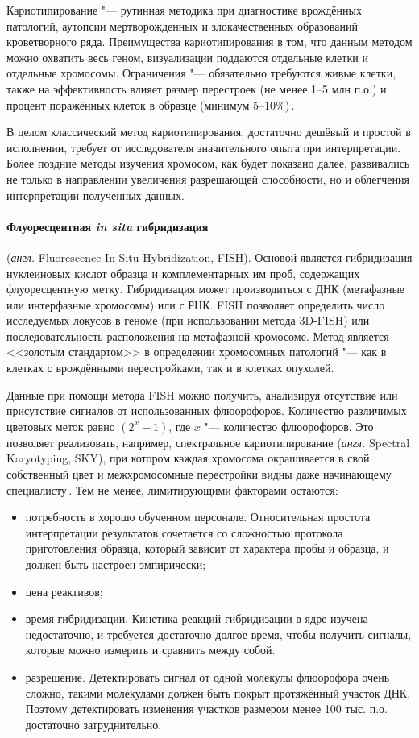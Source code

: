\documentclass[a4paper,14pt]{extarticle}
\newcommand{\anglia}[1]{\textit{англ.} \textenglish{#1}}
\begin{document}
Кариотипирование "--- рутинная методика при диагностике врождённых патологий, аутопсии мертворожденных и злокачественных образований кроветворного ряда.
Преимущества кариотипирования в том, что данным методом можно охватить весь геном, визуализации поддаются отдельные клетки и отдельные хромосомы.
Ограничения "--- обязательно требуются живые клетки, также на эффективность влияет размер перестроек (не менее 1--5 млн п.о.) и процент поражённых клеток в образце (минимум 5--10\%)\,\cite{Sampson_2014}.

В целом классический метод кариотипирования, достаточно дешёвый и простой в исполнении, требует от исследователя значительного опыта при интерпретации.
Более поздние методы изучения хромосом, как будет показано далее, развивались не только в направлении увеличения разрешающей способности, но и облегчения интерпретации полученных данных.

\paragraph{Флуоресцентная \textit{in situ} гибридизация} (\anglia{Fluorescence In Situ Hybridization, FISH}).
Основой является гибридизация нуклеиновых кислот образца и комплементарных им проб, содержащих флуоресцентную метку.
Гибридизация может производиться с ДНК (метафазные или интерфазные хромосомы) или с РНК.
FISH позволяет определить число исследуемых локусов в геноме (при использовании метода 3D-FISH) или последовательность расположения на метафазной хромосоме.
Метод является <<золотым стандартом>> в определении хромосомных патологий "--- как в клетках с врождёнными перестройками, так и в клетках опухолей.

Данные при помощи метода FISH можно получить, анализируя отсутствие или присутствие сигналов от использованных флюорофоров.
Количество различимых цветовых меток равно $(2^x - 1)$, где  $x$ "--- количество флюорофоров.
Это позволяет реализовать, например, спектральное кариотипирование (\anglia{Spectral Karyotyping, SKY}), при котором каждая хромосома окрашивается в свой собственный цвет и межхромосомные перестройки видны даже начинающему специалисту\,\cite{Guo_2014}.
Тем не менее, лимитирующими факторами остаются:

\begin{itemize}
\item потребность в хорошо обученном персонале.
Относительная простота интерпретации результатов сочетается со сложностью протокола приготовления образца, который зависит от характера пробы и образца, и должен быть настроен эмпирически;
\item цена реактивов;
\item время гибридизации.
Кинетика реакций гибридизации в ядре изучена недостаточно, и требуется достаточно долгое время, чтобы получить сигналы, которые можно измерить и сравнить между собой.
\item разрешение.
Детектировать сигнал от одной молекулы флюорофора очень сложно, такими молекулами должен быть покрыт протяжённый участок ДНК.
Поэтому детектировать изменения участков размером менее 100 тыс. п.о. достаточно затруднительно.
\end{itemize}
\end{document}
